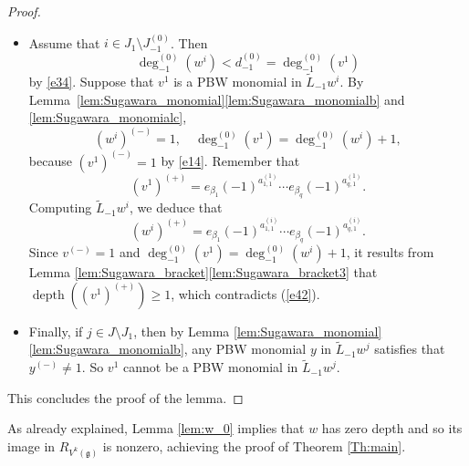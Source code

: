 \documentclass[11pt]{article}
\numberwithin{equation}{section}
\let\be\beta
\DeclareMathOperator{\dep}{depth}
\newcommand \g{\mathfrak g}
\theoremstyle{definition}
\begin{document}
\begin{proof}
\begin{itemize}
\item
Assume that $i\in J_1\setminus J_{-1}^{(0)}$.
Then
\begin{equation}
\label{eq:d01}
\deg_{-1}^{(0)} (w^{i})< d_{-1}^{(0)} =\deg_{-1}^{(0)}(v^1)
\end{equation}
by \eqref{e34}.
Suppose that $v^1$ is a PBW monomial in ${\tilde{L}_{-1} w^{i}}$.
By Lemma~\ref{lem:Sugawara_monomial}\eqref{lem:Sugawara_monomialb} and \eqref{lem:Sugawara_monomialc},%
\begin{equation}\label{e16}
(w^{i})^{(-)}=1, \quad \deg_{-1}^{(0)}(v^1)=\deg_{-1}^{(0)}(w^i)+1,
\end{equation}
because $(v^1)^{(-)}=1$ by \eqref{e14}.
Remember that
\begin{equation}\label{e42}
(v^1)^{(+)}=e_{\be_1}(-1)^{a^{(1)}_{1,1}}\cdots e_{\be_{q}}(-1)^{a^{(1)}_{q,1}}.
\end{equation}
Computing $\tilde{L}_{-1} w^{i}$, we deduce that
\[
(w^{i})^{(+)}=e_{\be_1}(-1)^{a^{(i)}_{1,1}}\cdots e_{\be_{q}}(-1)^{a^{(i)}_{q,1}}.
\]
{Since $v^{(-)}=1$ and $\deg_{-1}^{(0)}(v^1)=\deg_{-1}^{(0)}(w^i)+1$,
it results from Lemma \ref{lem:Sugawara_bracket}\eqref{lem:Sugawara_bracket3} that $\dep((v^1)^{(+)})\geq 1$,
which contradicts (\ref{e42})}.

\item
Finally, if $j \in J \setminus J_1$, then by Lemma \ref{lem:Sugawara_monomial}\eqref{lem:Sugawara_monomialb}, any PBW monomial $y$ in $\tilde{L}_{-1}w^j$ satisfies that $y^{(-)}\neq 1$. So $v^1$
cannot be a PBW monomial in $\tilde{L}_{-1}w^j$.
\end{itemize}
This concludes the proof of the lemma.
\end{proof}

As already explained, Lemma \ref{lem:w_0} implies that $w$ has zero depth
and so its image in $R_{V^k(\g)}$ is nonzero,
achieving the proof of Theorem \ref{Th:main}.
\end{document}
